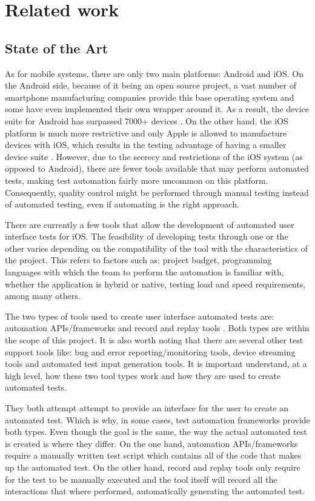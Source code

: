 \chapter{Related work}
\label{chapter2}

\section{State of the Art}

As for mobile systems, there are only two main platforms: Android and iOS. On the Android side, because of it being an open source project, a vast number of smartphone manufacturing companies provide this base operating system and some have even implemented their own wrapper around it. As a result, the device suite for Android has surpassed 7000+ devices \cite{Android Devices}. On the other hand, the iOS platform is much more restrictive and only Apple is allowed to manufacture devices with iOS, which results in the testing advantage of having a smaller device suite \cite{Apple Devices}. However, due to the secrecy and restrictions of the iOS system (as opposed to Android), there are fewer tools available that may perform automated tests, making test automation fairly more uncommon on this platform. Consequently, quality control might be performed through manual testing instead of automated testing, even if automating is the right approach.

There are currently a few tools that allow the development of automated user interface tests for iOS. The feasibility of developing tests through one or the other varies depending on the compatibility of the tool with the characteristics of the project. This refers to factors such as: project budget, programming languages with which the team to perform the automation is familiar with, whether the application is hybrid or native, testing load and speed requirements, among many others.

The two types of tools used to create user interface automated tests are: automation APIs/frameworks and record and replay tools \cite{Linares-Vasquez2017ContinuousTesting}. Both types are within the scope of this project. It is also worth noting that there are several other test support tools like: bug and error reporting/monitoring tools, device streaming tools and automated test input generation tools. It is important understand, at a high level, how these two tool types work and how they are used to create automated tests.

They both attempt attempt to provide an interface for the user to create an automated test. Which is why, in some cases, test automation frameworks provide both types. Even though the goal is the same, the way the actual automated test is created is where they differ. On the one hand, automation APIs/frameworks require a manually written test script which contains all of the code that makes up the automated test. On the other hand, record and replay tools only require for the test to be manually executed and the tool itself will record all the interactions that where performed, automatically generating the automated test.

